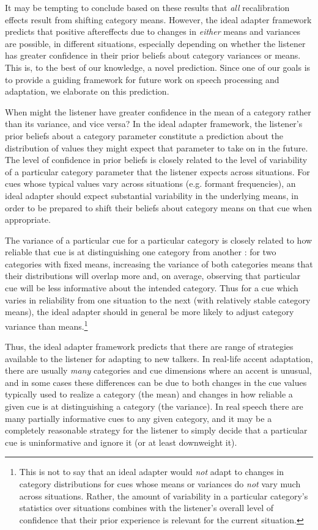 It may be tempting to conclude based on these results that \emph{all} recalibration effects result from shifting category means.  However, the ideal adapter framework predicts that positive aftereffects due to changes in \emph{either} means and variances are possible, in different situations, especially depending on whether the listener has greater confidence in their prior beliefs about category variances or means. This is, to the best of our knowledge, a novel prediction. Since one of our goals is to provide a guiding framework for future work on speech processing and adaptation, we elaborate on this prediction.

When might the listener have greater confidence in the mean of a category rather than its variance, and vice versa?  
In the ideal adapter framework, the listener's prior beliefs about a category parameter constitute a prediction about the distribution of values they might expect that parameter to take on in the future.  The level of confidence in prior beliefs is closely related to the level of variability of a particular category parameter that the listener expects across situations.  For cues whose typical values vary across situations (e.g. formant frequencies), an ideal adapter should expect substantial variability in the underlying means, in order to be prepared to shift their beliefs about category means on that cue when appropriate.

The variance of a particular cue for a particular category is closely related to how reliable that cue is at distinguishing one category from another \cite{Allen2004,Clayards2008,Newman2001,Toscano2010}: for two categories with fixed means, increasing the variance of both categories means that their distributions will overlap more and, on average, observing that particular cue will be less informative about the intended category.  Thus for a cue which varies in reliability from one situation to the next (with relatively stable category means), the ideal adapter should in general be more likely to adjust category variance than means.\footnote{This is not to say that an ideal adapter would \emph{not} adapt to changes in category distributions for cues whose means or variances do \emph{not} vary much across situations.
Rather, the amount of variability in a particular category's statistics over situations combines with the listener's overall level of confidence that their prior experience is relevant for the current situation.}

Thus, the ideal adapter framework predicts that there are range of strategies available to the listener for adapting to new talkers.  In real-life accent adaptation, there are usually \emph{many} categories and cue dimensions where an accent is unusual, and in some cases these differences can be due to both changes in the cue values typically used to realize a category (the mean) and changes in how reliable a given cue is at distinguishing a category (the variance).  In real speech there are many partially informative cues to any given category, and it may be a completely reasonable strategy for the listener to simply decide that a particular cue is uninformative and ignore it (or at least downweight it).

